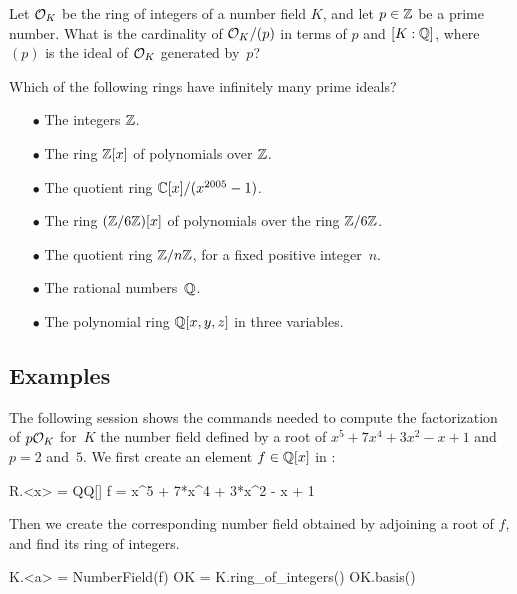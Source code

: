 \begin{exercise}
	Let $\mathcal{O}_K$ be the ring of integers of a number field $K$,
	and let $p\in\mathbb{Z}$ be a prime number.  What is the cardinality
	of $\mathcal{O}_K/(p)$ in terms of $p$ and $[K:\mathbb{Q}]$, 
	where $(p)$ is the ideal of $\mathcal{O}_K$ generated by~$p$?
\end{exercise}

\begin{exercise}
  Which of the following rings have infinitely
  many prime ideals?
  \begin{multicols}{2}
  \begin{enumerate}
    \item[$\bullet$] The integers $\mathbb{Z}$.
    \item[$\bullet$] The ring $\mathbb{Z}[x]$ of polynomials over $\mathbb{Z}$.
    \item[$\bullet$] The quotient ring $\mathbb{C}[x]/(x^{2005}-1)$.
    \item[$\bullet$] The ring $(\mathbb{Z}/6\mathbb{Z})[x]$ of polynomials over the ring $\mathbb{Z}/6\mathbb{Z}$.
    \item[$\bullet$] The quotient ring $\mathbb{Z}/n\mathbb{Z}$, for a fixed positive integer~$n$.
    \item[$\bullet$] The rational numbers~$\mathbb{Q}$.
    \item[$\bullet$] The polynomial ring $\mathbb{Q}[x,y,z]$ in three variables.
  \end{enumerate}
  \end{multicols}
\end{exercise}

\subsection{Examples}

The following \sage session shows the commands needed to compute
the factorization of $p\mathcal{O}_K$ for~$K$ the number field
defined by a root of $x^5+7x^4+3x^2-x+1$ and $p=2$ and~$5$.
We first create an element $f\in \mathbb{Q}[x]$ in \sage:
\begin{sagecode}
\begin{sagecell}
R.<x> = QQ[]
f = x^5 + 7*x^4 + 3*x^2 - x + 1
\end{sagecell}
\end{sagecode} %

\par\noindent{}Then we create the corresponding number field obtained
by adjoining a root of $f$, and find its ring of integers.
\begin{sagecode}
\begin{sagecell}
K.<a> = NumberField(f)
OK = K.ring_of_integers()
OK.basis()
\end{sagecell}
\begin{sageout}
[1, a, a^2, a^3, a^4]
\end{sageout}
\end{sagecode} %

